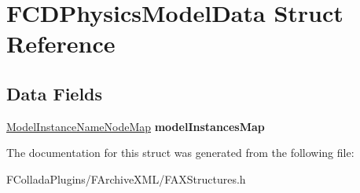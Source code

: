 \hypertarget{structFCDPhysicsModelData}{
\section{FCDPhysicsModelData Struct Reference}
\label{structFCDPhysicsModelData}
}
\subsection*{Data Fields}
\begin{DoxyCompactItemize}
\item 
\hypertarget{structFCDPhysicsModelData_abf8f83e227a7365c8cf06f771ac91e83}{
\hyperlink{classfm_1_1map}{ModelInstanceNameNodeMap} {\bfseries modelInstancesMap}}
\label{structFCDPhysicsModelData_abf8f83e227a7365c8cf06f771ac91e83}

\end{DoxyCompactItemize}


The documentation for this struct was generated from the following file:\begin{DoxyCompactItemize}
\item 
FColladaPlugins/FArchiveXML/FAXStructures.h\end{DoxyCompactItemize}
